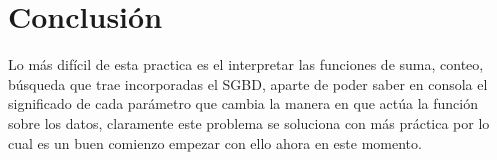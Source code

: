 \documentclass[titlepage,a4paper]{article}
\theoremstyle{definition}
\theoremstyle{remark}
\begin{document}
\section{Conclusión}
Lo más difícil de esta practica es el interpretar las funciones de suma, conteo, búsqueda que trae incorporadas el SGBD, aparte de poder saber en consola el significado de cada parámetro que cambia la manera en que actúa la función sobre los datos, claramente este problema se soluciona con más práctica por lo cual es un buen comienzo empezar con ello ahora en este momento.


\end{document}
